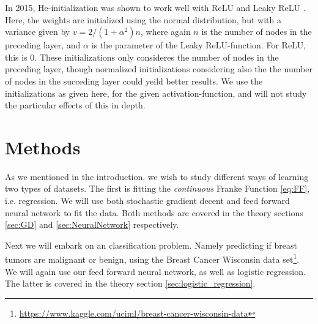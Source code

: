 \documentclass[12pt]{extarticle}
\begin{document}
In 2015, He-initialization was shown to work well with ReLU and Leaky ReLU \cite{He}. Here, the weights are initialized using the normal distribution, but with a variance given by $v = 2/(1 + \alpha^2)n$, where again $n$ is the number of nodes in the preceding layer, and $\alpha$ is the parameter of the Leaky ReLU-function. For ReLU, this is 0. These initializations only consideres the number of nodes in the preceding layer, though normalized initializations considering also the the number of nodes in the succeding layer could yeild better results. We use the initializations as given here, for the given activation-function, and will not study the particular effects of this in depth.



\section{Methods}
As we mentioned in the introduction, we wish to study different ways of learning two types of datasets. The first is fitting the \textit{continuous} Franke Function \eqref{eq:FF}, i.e. regression. We will use both stochastic gradient decent and feed forward neural network to fit the data. Both methods are covered in the theory sections \ref{sec:GD} and \ref{sec:NeuralNetwork} respectively.

Next we will embark on an classification problem. Namely predicting if breast tumors are malignant or benign, using the Breast Cancer Wisconsin data set\footnote{\href{https://www.kaggle.com/uciml/breast-cancer-wisconsin-data}{https://www.kaggle.com/uciml/breast-cancer-wisconsin-data}}. We will again use our feed forward neural network, as well as logistic regression. The latter is covered in the theory section \ref{sec:logistic_regression}.
\end{document}

